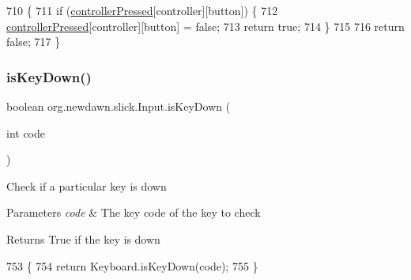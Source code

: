\begin{DoxyCode}
710                                                                 \{
711         \textcolor{keywordflow}{if} (\mbox{\hyperlink{classorg_1_1newdawn_1_1slick_1_1_input_a388a6d0a6069e1344ed26102b5d54c86}{controllerPressed}}[controller][button]) \{
712             \mbox{\hyperlink{classorg_1_1newdawn_1_1slick_1_1_input_a388a6d0a6069e1344ed26102b5d54c86}{controllerPressed}}[controller][button] = \textcolor{keyword}{false};
713             \textcolor{keywordflow}{return} \textcolor{keyword}{true};
714         \}
715         
716         \textcolor{keywordflow}{return} \textcolor{keyword}{false};
717     \}
\end{DoxyCode}
\mbox{\label{classorg_1_1newdawn_1_1slick_1_1_input_a2b904c85a112a9c531457c465f366ca8}} 
\subsubsection{\texorpdfstring{is\+Key\+Down()}{isKeyDown()}}
{\footnotesize\ttfamily boolean org.\+newdawn.\+slick.\+Input.\+is\+Key\+Down (\begin{DoxyParamCaption}\item[{int}]{code }\end{DoxyParamCaption})\hspace{0.3cm}{\ttfamily [inline]}}

Check if a particular key is down


\begin{DoxyParams}{Parameters}
{\em code} & The key code of the key to check \\
\hline
\end{DoxyParams}
\begin{DoxyReturn}{Returns}
True if the key is down 
\end{DoxyReturn}

\begin{DoxyCode}
753                                        \{
754         \textcolor{keywordflow}{return} Keyboard.isKeyDown(code);
755     \}
\end{DoxyCode}
\mbox{\label{classorg_1_1newdawn_1_1slick_1_1_input_a235ecf083734d727c4de50441b082649}} 
